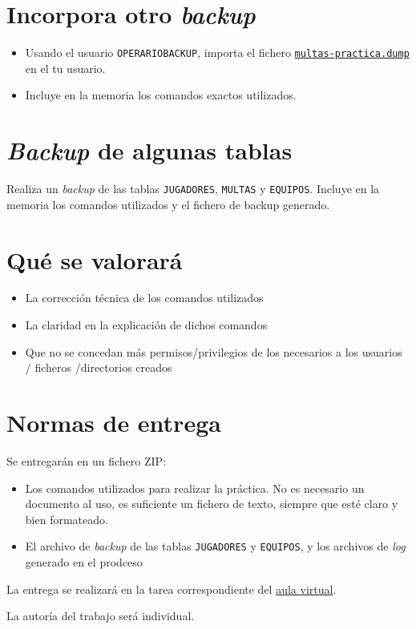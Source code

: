 \documentclass[a4paper]{article}
\begin{document}
\section*{Incorpora otro \emph{backup}}
\label{sec:org000000c}
\begin{itemize}
\item Usando el usuario \texttt{OPERARIOBACKUP}, importa el fichero \href{https://alvarogonzalezsotillo.github.io/apuntes-clase/sistemas-gestores-bbdd-asir2/apuntes/2/multas-practica.dump}{\texttt{multas-practica.dump}} en el tu usuario.
\item Incluye en la memoria los comandos exactos utilizados.
\end{itemize}

\section*{\emph{Backup} de algunas tablas}
\label{sec:org000000f}
Realiza un \emph{backup} de las tablas \texttt{JUGADORES}, \texttt{MULTAS} y \texttt{EQUIPOS}. Incluye en la memoria los comandos utilizados y el fichero de backup generado.  

\section*{Qué se valorará}
\label{sec:org0000012}
\begin{itemize}
\item La corrección técnica de los comandos utilizados
\item La claridad en la explicación de dichos comandos
\item Que no se concedan más permisos/privilegios de los necesarios a los usuarios / ficheros /directorios creados
\end{itemize}

\section*{Normas de entrega}
\label{sec:org0000015}
Se entregarán en un fichero ZIP:
\begin{itemize}
\item Los comandos utilizados para realizar la práctica. No es necesario un documento al uso, es suficiente un fichero de texto, siempre que esté claro y bien formateado.
\item El archivo de \emph{backup} de las tablas \texttt{JUGADORES} y \texttt{EQUIPOS}, y los archivos de \emph{log} generado en el prodceso
\end{itemize}

La entrega se realizará en la tarea correspondiente del \href{https://aulavirtual3.educa.madrid.org/ies.alonsodeavellan.alcala}{aula virtual}.

La autoría del trabajo será individual.
\end{document}
